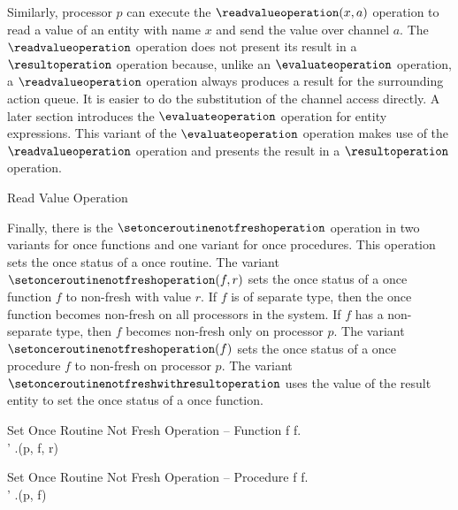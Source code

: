  
Similarly, processor $p$ can execute the $\readvalueoperation(x, a)$ operation to read a value of an entity with name $x$ and send the value over channel $a$. The $\readvalueoperation$ operation does not present its result in a $\resultoperation$ operation because, unlike an $\evaluateoperation$ operation, a $\readvalueoperation$ operation always produces a result for the surrounding action queue. It is easier to do the substitution of the channel access directly. A later section introduces the $\evaluateoperation$ operation for entity expressions. This variant of the $\evaluateoperation$ operation makes use of the $\readvalueoperation$ operation and presents the result in a $\resultoperation$ operation.

\singlelineinferencerule
	{Read Value Operation}
	{}
	{}
	{}
 
Finally, there is the $\setonceroutinenotfreshoperation$ operation in two variants for once functions and one variant for once procedures. This operation sets the once status of a once routine. The variant $\setonceroutinenotfreshoperation(f, r)$ sets the once status of a once function $f$ to non-fresh with value $r$. If $f$ is of separate type, then the once function becomes non-fresh on all processors in the system. If $f$ has a non-separate type, then $f$ becomes non-fresh only on processor $p$. The variant $\setonceroutinenotfreshoperation(f)$ sets the once status of a once procedure $f$ to non-fresh on processor $p$. The variant $\setonceroutinenotfreshwithresultoperation$ uses the value of the result entity to set the once status of a once function.

\singlelineinferencerule
	{Set Once Routine Not Fresh Operation -- Function}
	{
		f \in \functiontype \wedge f.\isonceroutinefeature \\
		\state' \mathematicaldefinition \state.\setoncefunctionnotfreshfeature(p, f, r)
	}
	{}
	{}

\singlelineinferencerule
	{Set Once Routine Not Fresh Operation -- Procedure}
	{
		f \in \proceduretype \wedge f.\isonceroutinefeature \\
		\state' \mathematicaldefinition \state.\setonceprocedurenotfreshfeature(p, f)
	}
	{}
	{}


